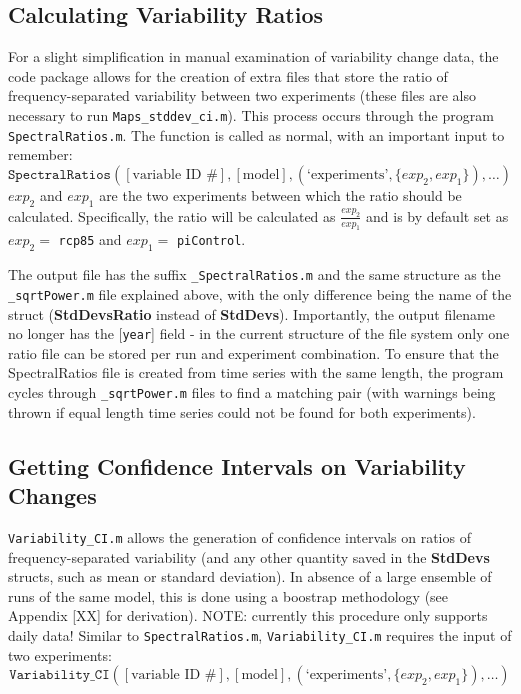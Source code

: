\documentclass{article}
\begin{document}
\subsection{Calculating Variability Ratios}
\label{func:SpectralRatios.m}
For a slight simplification in manual examination of variability change data, the code package allows for the creation of extra files that store the ratio of frequency-separated variability between two experiments (these files are also necessary to run \texttt{Maps\_stddev\_ci.m}). This process occurs through the program \texttt{SpectralRatios.m}. The function is called as normal, with an important input to remember:
\begin{equation}
\texttt{SpectralRatios}([\text{variable ID \#}],[\text{model}],(\text{`experiments'},\{exp_2,exp_1\}),\dots)
\end{equation}
$exp_2$ and $exp_1$ are the two experiments between which the ratio should be calculated. Specifically, the ratio will be calculated as $\frac{exp_2}{exp_1}$ and is by default set as $exp_2=$ \texttt{rcp85} and $exp_1=$ \texttt{piControl}.

The output file has the suffix \texttt{\_SpectralRatios.m} and the same structure as the \texttt{\_sqrtPower.m} file explained above, with the only difference being the name of the struct (\textbf{StdDevsRatio} instead of \textbf{StdDevs}). Importantly, the output filename no longer has the [\texttt{year}] field - in the current structure of the file system only one ratio file can be stored per run and experiment combination. To ensure that the SpectralRatios file is created from time series with the same length, the program cycles through \texttt{\_sqrtPower.m} files to find a matching pair (with warnings being thrown if equal length time series could not be found for both experiments). 

\subsection{Getting Confidence Intervals on Variability Changes}
\label{sec:var_ci}\label{func:Variability_CI.m}
\texttt{Variability\_CI.m} allows the generation of confidence intervals on ratios of frequency-separated variability (and any other quantity saved in the \textbf{StdDevs} structs, such as mean or standard deviation). In absence of a large ensemble of runs of the same model, this is done using a boostrap methodology (see Appendix [XX] for derivation). NOTE: currently this procedure only supports daily data! Similar to \texttt{SpectralRatios.m}, \texttt{Variability\_CI.m} requires the input of two experiments: 
\begin{equation}
\texttt{Variability\_CI}([\text{variable ID \#}],[\text{model}],(\text{`experiments'},\{exp_2,exp_1\}),\dots)
\end{equation}
\end{document}
